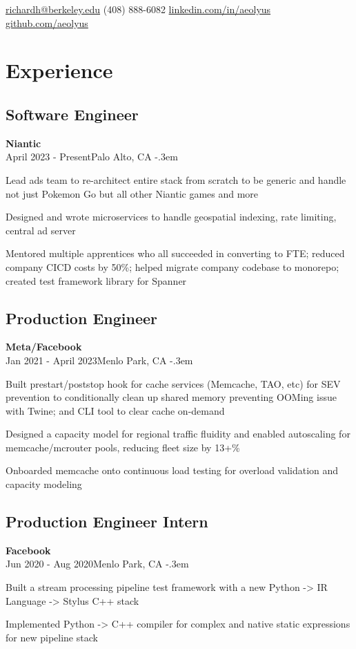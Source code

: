 \documentclass{article}
\makeatletter
\def\faEmail{{\FAFR \symbol{"F0E0}}} %
\def\faPhone{{\FAFR \symbol{"F095}}} %
\def\faLinkedin{{\FAB \symbol{"F08C}}} %
\def\faGithub{{\FAB \symbol{"F09B}}} %
\let\olditemize=\itemize \let\endolditemize=\enditemize
\renewenvironment{itemize}{\olditemize[topsep=0em] \itemsep-.3em}{\endolditemize}
\newcommand{\link}[1]{\href{https://#1}{#1}}
\newcommand{\entry}[3]{\quad\textbf{#1}\\#2\qquad#3}
\renewcommand{\maketitle}{
  \begin{flushleft}
    \Huge\bfseries\theauthor
  \end{flushleft}
  \begin{bfseries}
    \faEmail    \hspace{1pt} \href{mailto:richardh@berkeley.edu}{richardh@berkeley.edu} \quad
    \faPhone    \hspace{1pt} (408) 888-6082 \quad
    \faLinkedin \hspace{1pt} \link{linkedin.com/in/aeolyus} \quad
    \faGithub   \hspace{1pt} \link{github.com/aeolyus}
  \end{bfseries}
}
\makeatother
\begin{document}
\author{\color{accentcolor}Richard Huang}
\maketitle


\section{Experience}

\subsection{Software Engineer}
\entry{Niantic}{April 2023 - Present}{Palo Alto, CA}
\begin{itemize}
  \item Lead ads team to re-architect entire stack from scratch to be generic
    and handle not just Pokemon Go but all other Niantic games and more
  \item Designed and wrote microservices to handle geospatial indexing, rate
    limiting, central ad server
  \item Mentored multiple apprentices who all succeeded in converting to FTE;
    reduced company CICD costs by 50\%; helped migrate company codebase to
    monorepo; created test framework library for Spanner
\end{itemize}

\subsection{Production Engineer}
\entry{Meta/Facebook}{Jan 2021 - April 2023}{Menlo Park, CA}
\begin{itemize}
  \item Built prestart/poststop hook for cache services (Memcache, TAO, etc)
    for SEV prevention to conditionally clean up shared memory preventing
    OOMing issue with Twine; and CLI tool to clear cache on-demand
  \item Designed a capacity model for regional traffic fluidity and enabled
    autoscaling for memcache/mcrouter pools, reducing fleet size by 13+\%
  \item Onboarded memcache onto continuous load testing for overload validation
    and capacity modeling
\end{itemize}

\subsection{Production Engineer Intern}
\entry{Facebook}{Jun 2020 - Aug 2020}{Menlo Park, CA}
\begin{itemize}
  \item Built a stream processing pipeline test framework with a new Python -> IR Language -> Stylus C++ stack
  \item Implemented Python -> C++ compiler for complex and native static expressions for new pipeline stack
\end{itemize}
\end{document}
